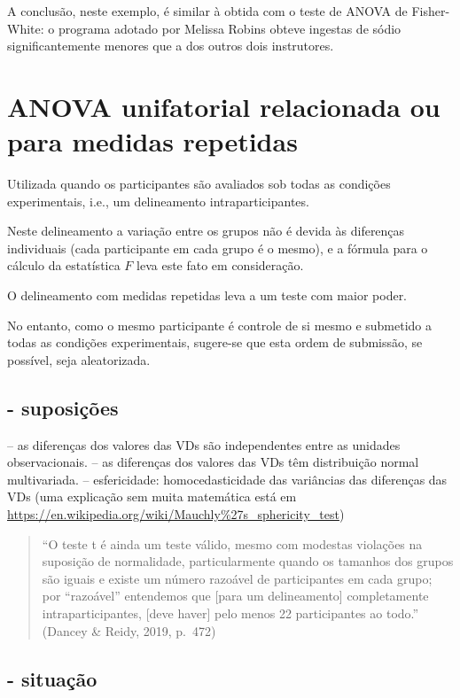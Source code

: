 \documentclass[]{article}
\begin{document}
A conclusão, neste exemplo, é similar à obtida com o teste de ANOVA de
Fisher-White: o programa adotado por Melissa Robins obteve ingestas de
sódio significantemente menores que a dos outros dois instrutores.

\section{ANOVA unifatorial relacionada ou para medidas
repetidas}\label{anova-unifatorial-relacionada-ou-para-medidas-repetidas}

Utilizada quando os participantes são avaliados sob todas as condições
experimentais, i.e., um delineamento intraparticipantes.

Neste delineamento a variação entre os grupos não é devida às diferenças
individuais (cada participante em cada grupo é o mesmo), e a fórmula
para o cálculo da estatística \(F\) leva este fato em consideração.

O delineamento com medidas repetidas leva a um teste com maior poder.

No entanto, como o mesmo participante é controle de si mesmo e submetido
a todas as condições experimentais, sugere-se que esta ordem de
submissão, se possível, seja aleatorizada.

\subsection{- suposições}\label{suposicoes-1}

-- as diferenças dos valores das VDs são independentes entre as unidades
observacionais. -- as diferenças dos valores das VDs têm distribuição
normal multivariada. -- esfericidade: homocedasticidade das variâncias
das diferenças das VDs (uma explicação sem muita matemática está em
\url{https://en.wikipedia.org/wiki/Mauchly\%27s_sphericity_test})

\begin{quote}
``O teste t é ainda um teste válido, mesmo com modestas violações na
suposição de normalidade, particularmente quando os tamanhos dos grupos
são iguais e existe um número razoável de participantes em cada grupo;
por ``razoável'' entendemos que {[}para um delineamento{]} completamente
intraparticipantes, {[}deve haver{]} pelo menos 22 participantes ao
todo.'' (Dancey \& Reidy, 2019, p.~472)
\end{quote}

\subsection{- situação}\label{situacao-1}
\end{document}
